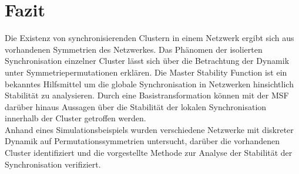 \section{Fazit}\label{fazit}
Die Existenz von synchronisierenden Clustern in einem Netzwerk ergibt sich aus vorhandenen Symmetrien des Netzwerkes. Das Phänomen der isolierten Synchronisation einzelner Cluster lässt sich über die Betrachtung der Dynamik unter Symmetriepermutationen erklären. 
Die Master Stability Function ist ein bekanntes Hilfsmittel um die globale Synchronisation in Netzwerken hinsichtlich Stabilität zu analysieren. Durch eine Basistransformation \cite{pecora2014} können mit der MSF darüber hinaus Aussagen über die Stabilität der lokalen Synchronisation innerhalb der Cluster getroffen werden.\\
Anhand eines Simulationsbeispiels wurden verschiedene Netzwerke mit diskreter Dynamik auf Permutationssymmetrien untersucht, darüber die vorhandenen Cluster identifiziert und die vorgestellte Methode zur Analyse der Stabilität der Synchronisation verifiziert.
